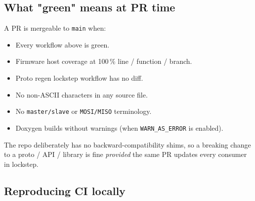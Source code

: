 \subsection{What "green" means at PR time}

A PR is mergeable to \texttt{main} when:

\begin{itemize}
  \item Every workflow above is green.
  \item Firmware host coverage at 100\,\% line / function / branch.
  \item Proto regen lockstep workflow has no diff.
  \item No non-ASCII characters in any source file.
  \item No \texttt{master/slave} or \texttt{MOSI/MISO} terminology.
  \item Doxygen builds without warnings (when \texttt{WARN\_AS\_ERROR} is enabled).
\end{itemize}

The repo deliberately has no backward-compatibility shims, so a
breaking change to a proto / API / library is fine \emph{provided}
the same PR updates every consumer in lockstep.

\subsection{Reproducing CI locally}

